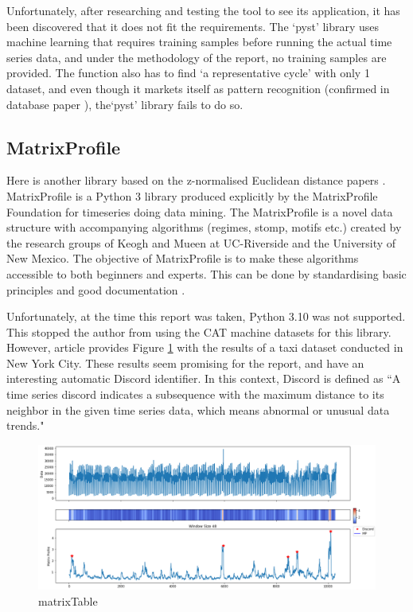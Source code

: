 Unfortunately, after researching and testing the tool to see its application, it has been discovered that it does not fit the requirements. The `pyst' library uses machine learning that requires training samples before running the actual time series data, and under the methodology of the report, no training samples are provided. The function also has to find `a representative cycle' with only 1 dataset, and even though it markets itself as pattern recognition (confirmed in database paper \cite{DBLP:journals/corr/abs-2104-07406}), the`pyst' library fails to do so.

\subsection{MatrixProfile}
Here is another library based on the z-normalised Euclidean distance papers \cite{zhu_imamura_nikovski_keogh_2017}. MatrixProfile is a Python 3 library produced explicitly by the MatrixProfile Foundation for timeseries doing data mining. The MatrixProfile is a novel data structure with accompanying algorithms (regimes, stomp, motifs etc.) created by the research groups of Keogh and Mueen at UC-Riverside and the University of New Mexico. The objective of MatrixProfile is to make these algorithms accessible to both beginners and experts. This can be done by standardising basic principles and good documentation \cite{Van_Benschoten2020}. 

Unfortunately, at the time this report was taken, Python 3.10 was not supported. This stopped the author from using the CAT machine datasets for this library. However, article \cite{Van_Benschoten2020} provides Figure \ref{matrixTable} with the results of a taxi dataset conducted in New York City. These results seem promising for the report, and have an interesting automatic Discord identifier. In this context, Discord is defined as ``A time series discord indicates a subsequence with the maximum distance to its neighbor in the given time series data, which means abnormal or unusual data trends."\cite{woodbridge_wilson_rintoul_goldstein_2015}

\begin{figure}
\centering
\includegraphics[scale=0.40]{images/examples_NYC_Taxis_8_2.png}
\caption{matrixTable}
\label{matrixTable}
\end{figure}

